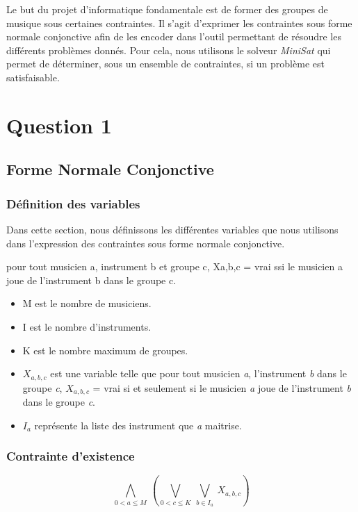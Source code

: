 \documentclass[11pt]{article}
\begin{document}
Le but du projet d'informatique fondamentale est de former des groupes de musique sous certaines contraintes. Il s'agit d'exprimer les contraintes sous forme normale conjonctive afin de les encoder dans l'outil permettant de résoudre les différents problèmes donnés. Pour cela, nous utilisons le solveur \textit{MiniSat} qui permet de déterminer, sous un ensemble de contraintes, si un problème est satisfaisable.

\section{Question 1}

\subsection{Forme Normale Conjonctive}

\subsubsection{Définition des variables}

Dans cette section, nous définissons les différentes variables que nous utilisons dans l'expression des contraintes sous forme normale conjonctive.

pour tout musicien a, instrument b et groupe c, Xa,b,c = vrai ssi le musicien a joue de l’instrument b dans le groupe c.

\begin{itemize}
\item M est le nombre de musiciens.
\item I est le nombre d'instruments.
\item K est le nombre maximum de groupes.
\item $X_{a,b,c}$ est une variable telle que pour tout musicien \textit{a}, l'instrument \textit{b} dans le groupe \textit{c}, $X_{a,b,c}$ = vrai si et seulement si le musicien \textit{a} joue de l’instrument \textit{b} dans le groupe \textit{c}.
\item $I_a$ représente la liste des instrument que \textit{a} maitrise.
\end{itemize}

\subsubsection{Contrainte d'existence}

$$\bigwedge\limits_{0<a\le M}\ \left(\bigvee\limits_{0<c\le K}\ \bigvee\limits_{b\in I_a}\ X_{a,b,c}\right)$$
\end{document}
